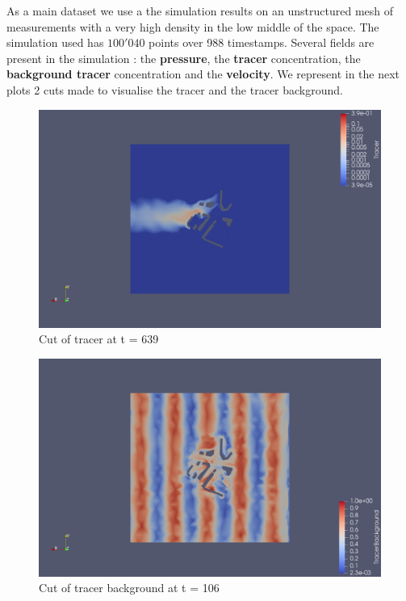 \documentclass[12pt,twoside]{report}
\begin{document}
As a main dataset we use a the simulation results on an unstructured mesh of measurements with a very high density in the low middle of the space. The simulation used has $100'040$ points over 988 timestamps. Several fields are present in the simulation : the \textbf{pressure}, the \textbf{tracer} concentration, the \textbf{background tracer} concentration and the \textbf{velocity}. We represent in the next plots 2 cuts made to visualise the tracer and the tracer background. \\ 
\begin{figure}[hbt]
  \includegraphics[width=\linewidth]{figures/Tracer/tracer_cut_z_639}
  \caption{Cut of tracer at t = 639 }
\end{figure}

\begin{figure}[hbt]
  \includegraphics[width=\linewidth]{figures/Tracer/tracerBackground_cut_z_106}
  \caption{Cut of tracer background at t = 106 }
\end{figure}
\end{document}
